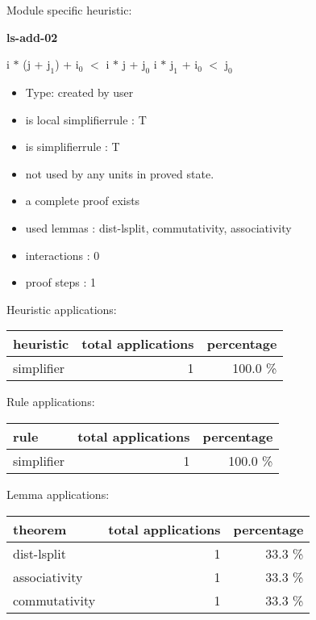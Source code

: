 \documentclass[a4paper]{article}
\begin{document}
Module specific heuristic:

\pagebreak

{\LARGE\bf ls-add-02}\label{lemma-ls-add-02}

\medskip

 \Fol i $*$ (j + $\mbox{j}_{1}$) + $\mbox{i}_{0}$ $<$ i $*$ j + $\mbox{j}_{0}$ \Equiv i $*$ $\mbox{j}_{1}$ + $\mbox{i}_{0}$ $<$ $\mbox{j}_{0}$

\begin{itemize}

\item Type: created by user

\item is local simplifierrule : T
\item is simplifierrule : T
\item not used by any units in proved state.
\item       a complete proof exists
\item       used lemmas  : dist-lsplit, commutativity, associativity
\item       interactions : 0
\item       proof steps  : 1
\end{itemize}

\medskip


Heuristic applications:

\begin{supertabular}{l|r|r}
heuristic	& total applications & percentage \\ \hline
simplifier & 1 & 100.0 \% \\

\end{supertabular}

Rule applications:

\begin{supertabular}{l|r|r}
rule	        & total applications & percentage \\ \hline
simplifier & 1 & 100.0 \% \\

\end{supertabular}

Lemma applications:

\begin{supertabular}{l|r|r}
theorem	        & total applications & percentage \\ \hline
dist-lsplit & 1 & 33.3 \% \\
associativity & 1 & 33.3 \% \\
commutativity & 1 & 33.3 \% \\

\end{supertabular}
\end{document}
